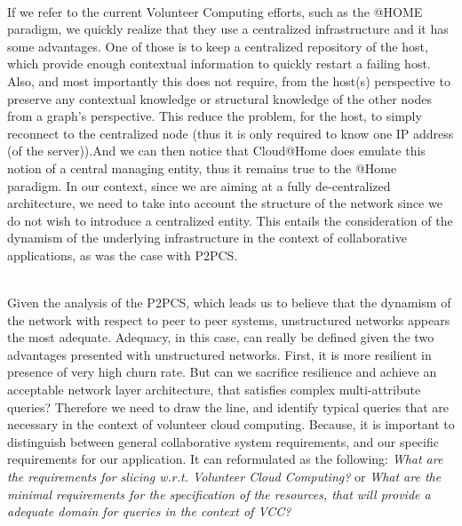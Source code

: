 \documentclass[11pt]{amsart}
\begin{document}
        \\ If we refer to the current Volunteer Computing efforts, such as the @HOME
        paradigm, we quickly realize that they use a centralized infrastructure and it has
        some advantages. One of those is to keep a centralized repository of the host,
        which provide enough contextual information to quickly restart a failing
        host. Also, and most importantly this does not require, from the host(s)
        perspective to preserve any contextual knowledge or structural knowledge of the
        other nodes from a graph's perspective. This reduce the problem, for the host, to
        simply reconnect to the centralized node (thus it is only required to know one IP
        address (of the server)).And we can then notice that Cloud@Home does emulate this
        notion of a central managing entity, thus it remains true to the @Home
        paradigm. In our context, since we are aiming at a fully de-centralized
        architecture, we need to take into account the structure of the network since we
        do not wish to introduce a centralized entity. This entails the consideration of
        the dynamism of the underlying infrastructure in the context of collaborative
        applications, as was the case with P2PCS. 

        \\ Given the analysis of the P2PCS, which leads us to believe that the dynamism of
        the network with respect to peer to peer systems, unstructured networks appears
        the most adequate. Adequacy, in this case, can really be defined given the two
        advantages presented with unstructured networks. First, it is more resilient in
        presence of very high churn rate. But can we sacrifice resilience and achieve an
        acceptable network layer architecture, that satisfies complex multi-attribute
        queries? Therefore we need to draw the line, and identify typical queries that are
        necessary in the context of volunteer cloud computing. Because, it is important to
        distinguish between general collaborative system requirements, and our specific
        requirements for our application. It can reformulated as the following: \emph{What
          are the requirements for slicing w.r.t. Volunteer Cloud Computing?} or
        \emph{What are the minimal requirements for the specification of the resources,
          that will provide a adequate domain for queries in the context of VCC?}
\end{document}
